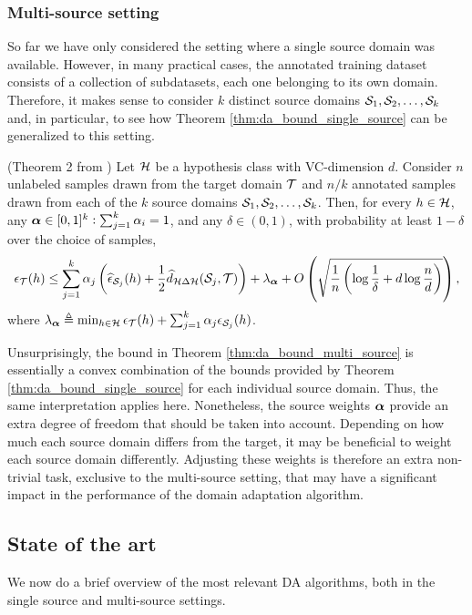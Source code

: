 \subsubsection{Multi-source setting}
\label{sec:da_theory_ms}
So far we have only considered the setting where a single source domain was available. However, in many practical cases, the annotated training dataset consists of a collection of subdatasets, each one belonging to its own domain. Therefore, it makes sense to consider $k$ distinct source domains ${\mathcal{S}}_1, {\mathcal{S}}_2, \dots, {\mathcal{S}}_k$ and, in particular, to see how Theorem \ref{thm:da_bound_single_source} can be generalized to this setting.
\begin{theorem}
	\label{thm:da_bound_multi_source}
	(Theorem 2 from \citet{Zhao2018}) Let ${\mathcal{H}}$ be a hypothesis class with VC-dimension $d$. Consider $n$ unlabeled samples drawn from the target domain ${\mathcal{T}}$ and $n/k$ annotated samples drawn from each of the $k$ source domains ${\mathcal{S}}_1, {\mathcal{S}}_2, \dots, {\mathcal{S}}_k$. Then, for every $h \in {\mathcal{H}}$, any ${\bm{\alpha}} \in [0,1]^k: \sum_{j=1}^k {\alpha}_i = 1$, and any $\delta \in (0,1)$, with probability at least $1-\delta$ over the choice of samples,
	\begin{equation}
		\label{eq:da_bound_multi_source}
		\epsilon_{\mathcal{T}}(h) \leq \sum_{j=1}^k {\alpha}_j \left(\widehat{\epsilon}_{{\mathcal{S}}_j}(h) + \frac{1}{2} \widehat{d}_{{\mathcal{H}} \Delta {\mathcal{H}}}({\mathcal{S}}_j, {\mathcal{T}})\right) + \lambda_{\bm{\alpha}} + O \left(\sqrt{\frac{1}{n} \left(\log \frac{1}{\delta} +d \log \frac{n}{d} \right)} \right),
	\end{equation}
	where $\lambda_{\bm{\alpha}} \triangleq \min_{h \in {\mathcal{H}}} \epsilon_{\mathcal{T}}(h) + \sum_{j=1}^k {\alpha}_j \epsilon_{{\mathcal{S}}_j}(h)$.
\end{theorem}
Unsurprisingly, the bound in Theorem \ref{thm:da_bound_multi_source} is essentially a convex combination of the bounds provided by Theorem \ref{thm:da_bound_single_source} for each individual source domain. Thus, the same interpretation applies here. Nonetheless, the source weights ${\bm{\alpha}}$ provide an extra degree of freedom that should be taken into account. Depending on how much each source domain differs from the target, it may be beneficial to weight each source domain differently. Adjusting these weights is therefore an extra non-trivial task, exclusive to the multi-source setting, that may have a significant impact in the performance of the domain adaptation algorithm.

\subsection{State of the art}
\label{sec:da_sota}
We now do a brief overview of the most relevant DA algorithms, both in the single source and multi-source settings.


